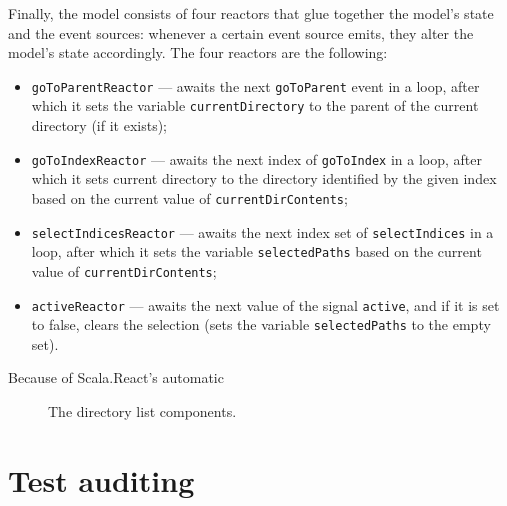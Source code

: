 Finally, the model consists of four reactors that glue together the model's state and the event sources: whenever a certain event source emits, they alter the model's state accordingly. The four reactors are the following:
\begin{itemize}
\item \texttt{goToParentReactor} --- awaits the next \texttt{goToParent} event in a loop, after which it sets the variable \texttt{currentDirectory} to the parent of the current directory (if it exists);
\item \texttt{goToIndexReactor} --- awaits the next index of \texttt{goToIndex} in a loop, after which it sets current directory to the directory identified by the given index based on the current value of \texttt{currentDirContents};
\item \texttt{selectIndicesReactor} --- awaits the next index set of \texttt{selectIndices} in a loop, after which it sets the variable \texttt{selectedPaths} based on the current value of \texttt{currentDirContents};
\item \texttt{activeReactor} --- awaits the next value of the signal \texttt{active}, and if it is set to false, clears the selection (sets the variable \texttt{selectedPaths} to the empty set).
\end{itemize}

Because of Scala.React's automatic 

\begin{figure}[h!]
\centering
{}
\caption{The directory list components.}
\label{fig:mvc_pattern}
\end{figure}



\section{Test auditing}\label{sec:test-auditing}

